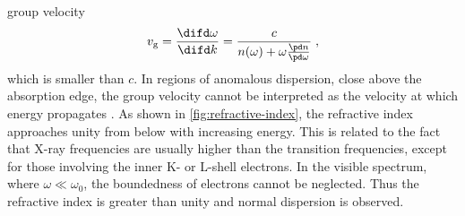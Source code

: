 \documentclass[
twoside,
openright,
titlepage,
numbers=noenddot,
headinclude,
fleqn,
a4paper,
footinclude=true,
cleardoublepage=empty,
abstractoff,
BCOR=5mm,
paper=a4,
fontsize=11pt,
british,ngerman,american,
]{scrreprt}
\begin{document}
group velocity 
\begin{equation}
  \label{eq:group-velocity-2}
  v_{\mathrm{g}} = \frac{\difd\omega}{\difd k}
  =\frac{c}{n(\omega)+\omega\frac{\pd n}{\pd\omega}}\;,
\end{equation}
which is smaller than $c$.  In regions of anomalous dispersion, \ie{}
close above the absorption edge, the group velocity cannot be
interpreted as the velocity at which energy propagates
\cite{Brillouin1960}.  As shown in \cref{fig:refractive-index}, the
refractive index approaches unity from below with increasing energy.
This is related to the fact that X-ray frequencies are usually higher
than the transition frequencies, except for those involving the inner
K- or L-shell electrons.  In the visible spectrum, where
$\omega\ll\omega_0$, the boundedness of electrons cannot be neglected.
Thus the refractive index is greater than unity and normal dispersion
is observed.
\end{document}
